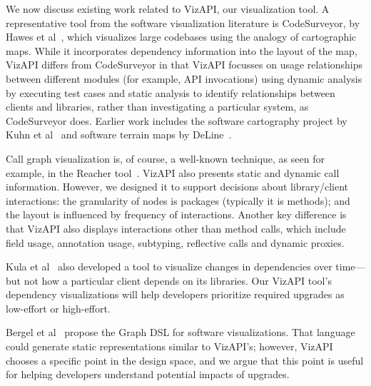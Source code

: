 We now discuss existing work related to VizAPI, our visualization tool.
A representative tool from the software visualization literature is
CodeSurveyor, by Hawes et al~\cite{hawes15:_codes}, which visualizes large
codebases using the analogy of cartographic maps. While it
incorporates dependency information into the layout of the map, VizAPI
differs from CodeSurveyor in that VizAPI focusses on usage relationships
between different modules (for example, API invocations) using dynamic analysis by executing test
cases and static analysis to identify relationships between clients and libraries, rather
than investigating a particular system, as CodeSurveyor does.  Earlier
work includes the software cartography project by Kuhn et
al~\cite{kuhn10:_softw} and software terrain maps by DeLine~\cite{deline05:_stayin}.


Call graph visualization is, of course, a well-known technique, as seen for example, in the Reacher tool~\cite{latoza11:_visual_call_graph}. 
VizAPI also presents static and dynamic call information. However, we designed
it to support decisions about library/client interactions: the granularity of nodes is packages (typically it is methods);
and the layout is influenced by frequency of interactions. Another key difference is that VizAPI also displays interactions other than method calls, which include field usage, annotation usage, subtyping, reflective calls and dynamic proxies.

Kula et al~\cite{kula14:_visual_evolut_system_their_librar_depen} also developed a tool
to visualize changes in dependencies over time---but not how a particular client depends on its libraries. 
Our VizAPI tool's dependency visualizations will help developers
prioritize required upgrades as low-effort or high-effort.
 

Bergel et al~\cite{bergel14:_domain_specif_languag_visual_softw_depen_graph} propose the {\sc Graph} DSL
for software visualizations. That language could generate static representations similar to VizAPI's; however,
VizAPI chooses a specific point in the design space, and we argue that this point is useful for helping developers understand
potential impacts of upgrades.

